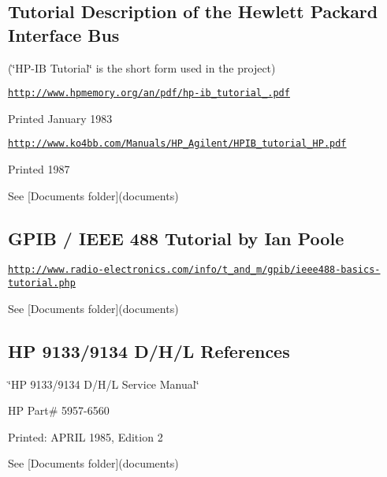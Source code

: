  \subsection*{Tutorial Description of the Hewlett Packard Interface Bus}


\begin{DoxyItemize}
\item (\char`\"{}\+H\+P-\/\+I\+B Tutorial\char`\"{} is the short form used in the project)
\item \href{http://www.hpmemory.org/an/pdf/hp-ib_tutorial_1980.pdf}{\tt http\+://www.\+hpmemory.\+org/an/pdf/hp-\/ib\+\_\+tutorial\+\_.\+pdf}
\item Printed January 1983
\item \href{http://www.ko4bb.com/Manuals/HP_Agilent/HPIB_tutorial_HP.pdf}{\tt http\+://www.\+ko4bb.\+com/\+Manuals/\+H\+P\+\_\+\+Agilent/\+H\+P\+I\+B\+\_\+tutorial\+\_\+\+H\+P.\+pdf}
\item Printed 1987
\item See \mbox{[}Documents folder\mbox{]}(documents)
\end{DoxyItemize}



 \subsection*{G\+P\+IB / I\+E\+EE 488 Tutorial by Ian Poole}


\begin{DoxyItemize}
\item \href{http://www.radio-electronics.com/info/t_and_m/gpib/ieee488-basics-tutorial.php}{\tt http\+://www.\+radio-\/electronics.\+com/info/t\+\_\+and\+\_\+m/gpib/ieee488-\/basics-\/tutorial.\+php}
\end{DoxyItemize}

See \mbox{[}Documents folder\mbox{]}(documents)



 \subsection*{HP 9133/9134 D/\+H/L References}


\begin{DoxyItemize}
\item \char`\"{}\+H\+P 9133/9134 D/\+H/\+L Service Manual\char`\"{}
\item HP Part\# 5957-\/6560
\item Printed\+: A\+P\+R\+IL 1985, Edition 2
\item See \mbox{[}Documents folder\mbox{]}(documents) 


\end{DoxyItemize}

